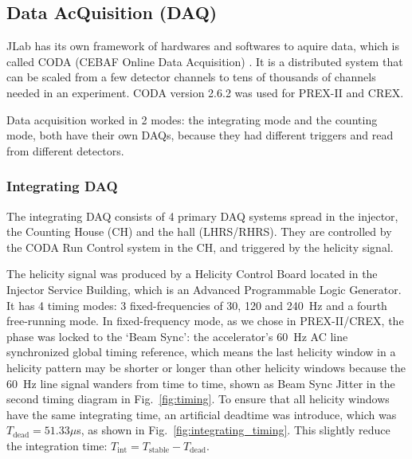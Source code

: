 \subsection{Data AcQuisition (DAQ)}
JLab has its own framework of hardwares and softwares to aquire data, which
is called CODA (CEBAF Online Data Acquisition) \cite{CODA}. It is a distributed
system that can be scaled from a few detector channels to tens of thousands of
channels needed in an experiment. CODA version 2.6.2 was used for PREX-II and CREX.

Data acquisition worked in 2 modes: the integrating mode and the counting mode,
both have their own DAQs, because they had different triggers and read from
different detectors.

\subsubsection{Integrating DAQ}
The integrating DAQ consists of 4 primary DAQ systems spread in the injector,
the Counting House (CH) and the hall (LHRS/RHRS). They are controlled by the
CODA Run Control system in the CH, and triggered by the helicity signal.

The helicity signal was produced by a Helicity Control Board \cite{Hboard} 
located in the Injector Service Building, which is an Advanced Programmable Logic
Generator. It has 4 timing modes: 3 fixed-frequencies of 30, 120 and 240~Hz
and a fourth free-running mode. In fixed-frequency mode, as we chose in PREX-II/CREX,
the phase was locked to the `Beam Sync': the accelerator's 60~Hz AC line synchronized 
global timing reference, which means the last helicity window in a helicity pattern
may be shorter or longer than other helicity windows because the 60~Hz line signal
wanders from time to time, shown as Beam Sync Jitter in the second timing diagram 
in Fig.~\ref{fig:timing}. To ensure that all helicity windows have the same integrating
time, an artificial deadtime was introduce, which was $T_{\text{dead}} = 51.33 \mu$s,
as shown in Fig.~\ref{fig:integrating_timing}.
This slightly reduce the integration time: $T_{\text{int}} = T_{\text{stable}} - T_{\text{dead}}$.

